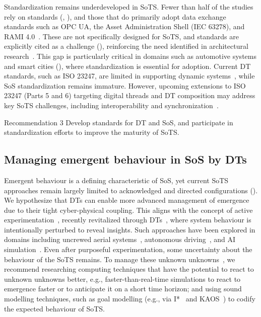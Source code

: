 Standardization remains underdeveloped in SoTS. Fewer than half of the studies rely on standards (, ), and those that do primarily adopt data exchange standards such as OPC UA, the Asset Administration Shell (IEC 63278), and RAMI 4.0~\cite{shao2024manufacturing}. These are not specifically designed for SoTS, and standards are explicitly cited as a challenge (), reinforcing the need identified in architectural research~\cite{ferko2022architecting}. This gap is particularly critical in domains such as automotive systems and smart cities (), where standardization is essential for adoption. Current DT standards, such as ISO 23247, are limited in supporting dynamic systems~\cite{liu2024ai}, while SoS standardization remains immature. However, upcoming extensions to ISO 23247 (Parts 5 and 6) targeting digital threads and DT composition may address key SoTS challenges, including interoperability and synchronization~\cite{shao2024manufacturing}.

\begin{recoframe}{Recommendation 3}
Develop standards for DT and SoS, and participate in standardization efforts to improve the maturity of SoTS.
\end{recoframe}


\subsection{Managing emergent behaviour in SoS by DTs}

Emergent behaviour is a defining characteristic of SoS, yet current SoTS approaches remain largely limited to acknowledged and directed configurations (). We hypothesize that DTs can enable more advanced management of emergence due to their tight cyber-physical coupling. This aligns with the concept of active experimentation~\cite{zeigler2018theory}, recently revitalized through DTs~\cite{mittal2023towards,barat2022digital}, where system behaviour is intentionally perturbed to reveal insights. Such approaches have been explored in domains including uncrewed aerial systems~\cite{guo2023intelligent}, autonomous driving~\cite{pun2023neural}, and AI simulation~\cite{liu2025ai}. Even after purposeful experimentation, some uncertainty about the behaviour of the SoTS remains. To manage these unknown unknowns~\cite{ramasesh2014conceptual}, we recommend researching computing techniques that have the potential to react to unknown unknowns better, e.g., faster-than-real-time simulations to react to emergence faster or to anticipate it on a short time horizon; and using sound modelling techniques, such as goal modelling (e.g., via I*~\cite{goncalves2018systematic} and KAOS~\cite{goncalves2025systematic}) to codify the expected behaviour of SoTS.



